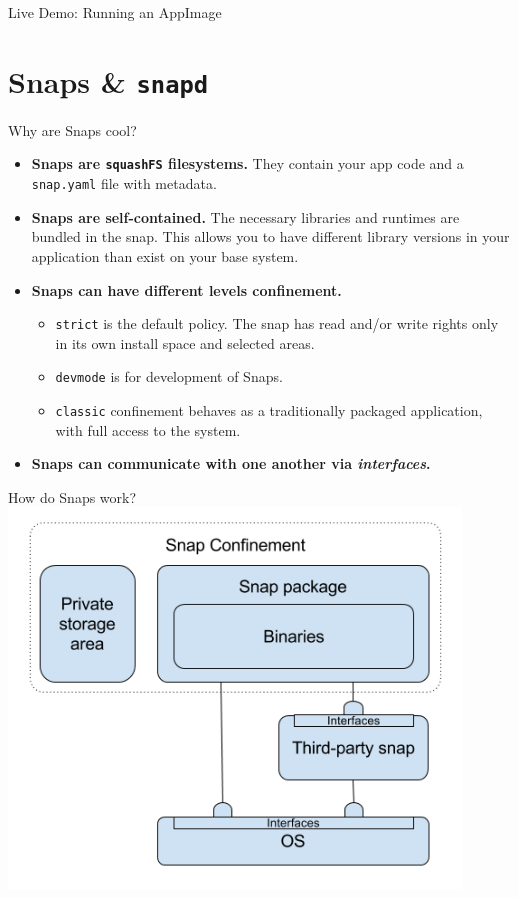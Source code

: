 \documentclass{lug}
\begin{document}
\begin{frame}
    \Huge
    Live Demo: Running an AppImage
\end{frame}

\section{Snaps \& \texttt{snapd}}
\begin{frame}{Why are Snaps cool?}
    \begin{itemize}
        \item \textbf{Snaps are \texttt{squashFS} filesystems.} They contain
            your app code and a \texttt{snap.yaml} file with metadata.
        \item \textbf{Snaps are self-contained.} The necessary libraries and
            runtimes are bundled in the snap. This allows you to have different
            library versions in your application than exist on your base system.
        \item \textbf{Snaps can have different levels confinement.}
            \begin{itemize}
                \small
                \item \texttt{strict} is the default policy. The snap has read
                    and/or write rights only in its own install space and
                    selected areas.
                \item \texttt{devmode} is for development of Snaps.
                \item \texttt{classic} confinement behaves as a traditionally
                    packaged application, with full access to the system.
            \end{itemize}
        \item \textbf{Snaps can communicate with one another via
            \textit{interfaces}.}
    \end{itemize}
\end{frame}

\begin{frame}{How do Snaps work?}
    \center
    \includegraphics[width=0.9\textwidth]{./graphics/snap_arch}
\end{frame}
\end{document}
